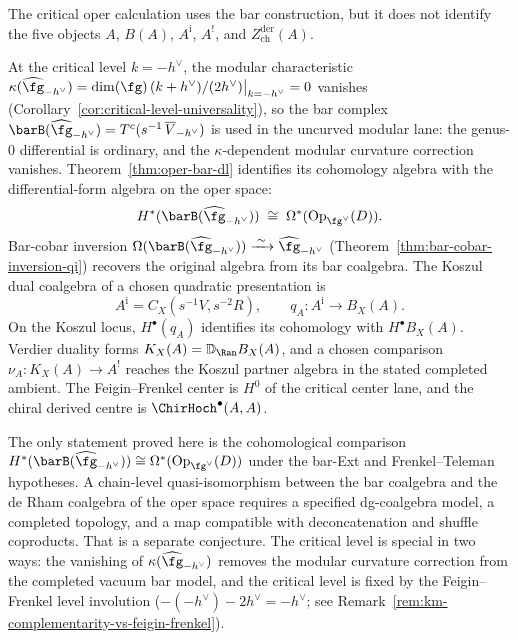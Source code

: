 \begin{remark}
\label{rem:bar-critical-oper-deRham}
\ClaimStatusConjectured
{}
The critical oper calculation uses the bar construction, but it does
not identify the five objects
$A$, $B(A)$, $A^{\mathrm i}$, $A^!$, and
$Z^{\mathrm{der}}_{\mathrm{ch}}(A)$.

At the critical level $k = -h^\vee$, the modular characteristic
$\kappa(\widehat{\fg}_{-h^\vee})
= \dim(\fg)\,(k + h^\vee)/(2h^\vee)\big|_{k=-h^\vee} = 0$
vanishes (Corollary~\ref{cor:critical-level-universality}), so the
bar complex $\barB(\widehat{\fg}_{-h^\vee})
= T^c(s^{-1}\,\overline{V}_{-h^\vee})$
is used in the uncurved modular lane: the genus-$0$ differential is
ordinary, and the $\kappa$-dependent modular curvature correction
vanishes.
Theorem~\ref{thm:oper-bar-dl} identifies its cohomology algebra
with the differential-form algebra on the oper space:
\[
H^*(\barB(\widehat{\fg}_{-h^\vee}))
\;\cong\;
\Omega^*(\mathrm{Op}_{\fg^\vee}(D)).
\]
Bar-cobar inversion
$\Omega(\barB(\widehat{\fg}_{-h^\vee}))
\xrightarrow{\;\sim\;} \widehat{\fg}_{-h^\vee}$
(Theorem~\ref{thm:bar-cobar-inversion-qi})
recovers the original algebra from its bar coalgebra. The Koszul dual
coalgebra of a chosen quadratic presentation is
\[
A^{\mathrm i}=C_X(s^{-1}V,s^{-2}R),\qquad
q_A\colon A^{\mathrm i}\longrightarrow B_X(A).
\]
On the Koszul locus, $H^\bullet(q_A)$ identifies its cohomology with
$H^\bullet B_X(A)$.  Verdier duality forms
$K_X(A)=\mathbb D_{\Ran}B_X(A)$, and a chosen comparison
$\nu_A\colon K_X(A)\to A^!$ reaches the Koszul partner algebra in the
stated completed ambient. The Feigin--Frenkel center is
$H^0$ of the critical center lane, and the chiral derived centre is
$\ChirHoch^\bullet(A,A)$.

The only statement proved here is the cohomological comparison
$H^*(\barB(\widehat{\fg}_{-h^\vee}))
\cong\Omega^*(\mathrm{Op}_{\fg^\vee}(D))$ under the bar-Ext and
Frenkel--Teleman hypotheses. A chain-level quasi-isomorphism between
the bar coalgebra and the de Rham coalgebra of the oper space requires
a specified dg-coalgebra model, a completed topology, and a
map compatible with deconcatenation and shuffle coproducts. That is a
separate conjecture.
The critical level is special in two ways: the vanishing of
$\kappa(\widehat{\fg}_{-h^\vee})$ removes the modular curvature
correction from the completed vacuum bar model, and the critical level is fixed by the
Feigin--Frenkel level involution ($-(-h^\vee) - 2h^\vee = -h^\vee$; see
Remark~\ref{rem:km-complementarity-vs-feigin-frenkel}).
\end{remark}

